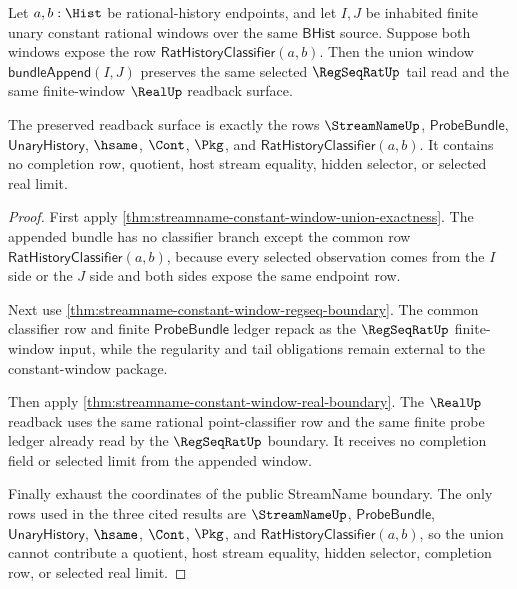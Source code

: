 \begin{theorem}
\label{thm:streamname-constant-union-regseq-real-readback-preservation}
Let $a,b:\Hist$ be rational-history endpoints, and let $I,J$ be inhabited
finite unary constant rational windows over the same $\mathsf{BHist}$ source.
Suppose both windows expose the row $\mathsf{RatHistoryClassifier}(a,b)$. Then
the union window $\mathsf{bundleAppend}(I,J)$ preserves the same selected
$\RegSeqRatUp$ tail read and the same finite-window $\RealUp$ readback surface.

The preserved readback surface is exactly the rows $\StreamNameUp$,
$\mathsf{ProbeBundle}$, $\mathsf{UnaryHistory}$, $\hsame$, $\Cont$, $\Pkg$, and
$\mathsf{RatHistoryClassifier}(a,b)$. It contains no completion row, quotient,
host stream equality, hidden selector, or selected real limit.
\end{theorem}
\begin{proof}
First apply
\autoref{thm:streamname-constant-window-union-exactness}. The appended bundle
has no classifier branch except the common row
$\mathsf{RatHistoryClassifier}(a,b)$, because every selected observation comes
from the $I$ side or the $J$ side and both sides expose the same endpoint row.

Next use \autoref{thm:streamname-constant-window-regseq-boundary}. The common
classifier row and finite $\mathsf{ProbeBundle}$ ledger repack as the
$\RegSeqRatUp$ finite-window input, while the regularity and tail obligations
remain external to the constant-window package.

Then apply \autoref{thm:streamname-constant-window-real-boundary}. The
$\RealUp$ readback uses the same rational point-classifier row and the same
finite probe ledger already read by the $\RegSeqRatUp$ boundary. It receives no
completion field or selected limit from the appended window.

Finally exhaust the coordinates of the public StreamName boundary. The only rows
used in the three cited results are $\StreamNameUp$, $\mathsf{ProbeBundle}$,
$\mathsf{UnaryHistory}$, $\hsame$, $\Cont$, $\Pkg$, and
$\mathsf{RatHistoryClassifier}(a,b)$, so the union cannot contribute a quotient,
host stream equality, hidden selector, completion row, or selected real limit.
\end{proof}

